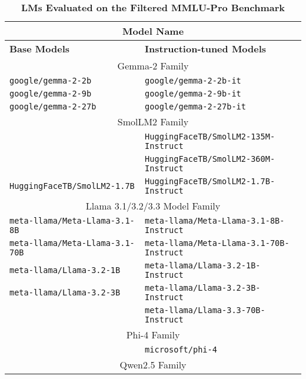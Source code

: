 \begin{table}[!htbp]
    \centering
    \caption{\textbf{LMs Evaluated on the Filtered MMLU-Pro Benchmark}}
    \begin{tabular}{l|l}
        \hline
        \multicolumn{2}{c}{\textbf{Model Name}} \\
        \hline \hline
        \textbf{Base Models} & \textbf{Instruction-tuned Models} \\
        \hline
        \multicolumn{2}{c}{Gemma-2 Family \citep{gemmateam2024gemma2improvingopen}} \\
        \texttt{google/gemma-2-2b} & \texttt{google/gemma-2-2b-it} \\
        \texttt{google/gemma-2-9b} & \texttt{google/gemma-2-9b-it} \\
        \texttt{google/gemma-2-27b} & \texttt{google/gemma-2-27b-it} \\
        \midrule
        \multicolumn{2}{c}{SmolLM2 Family \citep{allal2024smollm2}} \\
        & \texttt{HuggingFaceTB/SmolLM2-135M-Instruct} \\
        & \texttt{HuggingFaceTB/SmolLM2-360M-Instruct} \\
        \texttt{HuggingFaceTB/SmolLM2-1.7B} & \texttt{HuggingFaceTB/SmolLM2-1.7B-Instruct} \\
        \midrule
        \multicolumn{2}{c}{Llama 3.1/3.2/3.3 Model Family \citep{grattafiori2024llama3herdmodels, meta2024llama32, meta2024llama33}} \\
        \texttt{meta-llama/Meta-Llama-3.1-8B} & \texttt{meta-llama/Meta-Llama-3.1-8B-Instruct} \\
        \texttt{meta-llama/Meta-Llama-3.1-70B} & \texttt{meta-llama/Meta-Llama-3.1-70B-Instruct} \\
        \texttt{meta-llama/Llama-3.2-1B} & \texttt{meta-llama/Llama-3.2-1B-Instruct} \\
        \texttt{meta-llama/Llama-3.2-3B} & \texttt{meta-llama/Llama-3.2-3B-Instruct} \\
        & \texttt{meta-llama/Llama-3.3-70B-Instruct} \\
        \midrule
        \multicolumn{2}{c}{Phi-4 Family \citep{phillm2024phi4}} \\
        & \texttt{microsoft/phi-4} \\
        \midrule
        \multicolumn{2}{c}{Qwen2.5 Family \citep{qwen2025qwen25technicalreport}} \\

\end{tabular}
\end{table}
